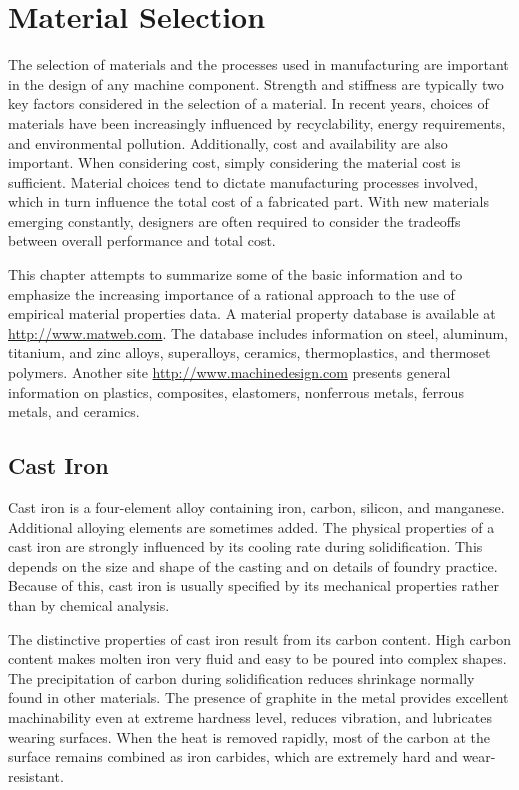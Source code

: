\documentclass[
10pt,
a4paper,
openany,
svgnames,
]{book}
\begin{document}
 
\chapter{Material Selection}

The selection of materials and the processes used in manufacturing are important in the design of any machine component. Strength and stiffness are typically two key factors considered in the selection of a material. In recent years, choices of materials have been increasingly influenced by recyclability, energy requirements, and environmental pollution. Additionally, cost and availability are also important. When considering cost, simply considering the material cost is sufficient. Material choices tend to dictate manufacturing processes involved, which in turn influence the total cost of a fabricated part. With new materials emerging constantly, designers are often required to consider the tradeoffs between overall performance and total cost.

This chapter attempts to summarize some of the basic information and to emphasize the increasing importance of a rational approach to the use of empirical material properties data. A material property database is available at \url{http://www.matweb.com}. The database includes information on steel, aluminum, titanium, and zinc alloys, superalloys, ceramics, thermoplastics, and thermoset polymers. Another site \url{http://www.machinedesign.com} presents general information on plastics, composites, elastomers, nonferrous metals, ferrous metals, and ceramics.

\section{Cast Iron}

Cast iron is a four-element alloy containing iron, carbon, silicon, and manganese. Additional alloying elements are sometimes added. The physical properties of a cast iron are strongly influenced by its cooling rate during solidification. This depends on the size and shape of the casting and on details of foundry practice. Because of this, cast iron is usually specified by its mechanical properties rather than by chemical analysis.

The distinctive properties of cast iron result from its carbon content. High carbon content makes molten iron very fluid and easy to be poured into complex shapes. The precipitation of carbon during solidification reduces shrinkage normally found in other materials. The presence of graphite in the metal provides excellent machinability even at extreme hardness level, reduces vibration, and lubricates wearing surfaces. When the heat is removed rapidly, most of the carbon at the surface remains combined as iron carbides, which are extremely hard and wear-resistant.
\end{document}

